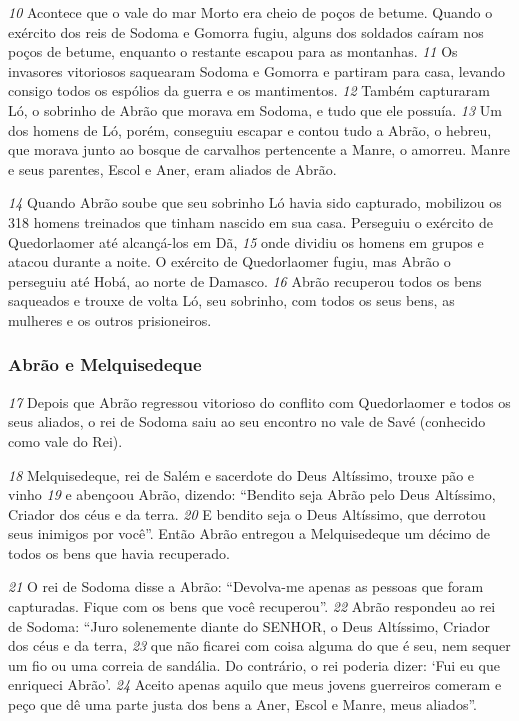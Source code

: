 \bigskip
\textit{\tiny 10}
Acontece que o vale do mar Morto era
cheio de poços de betume. Quando o exército dos reis de Sodoma e Gomorra
fugiu, alguns dos soldados caíram nos poços de betume, enquanto o restante
escapou para as montanhas. 
\textit{\tiny 11}
Os invasores vitoriosos saquearam Sodoma e
Gomorra e partiram para casa, levando consigo todos os espólios da guerra e os
mantimentos. 
\textit{\tiny 12}
Também capturaram Ló, o sobrinho de Abrão que morava em
Sodoma, e tudo que ele possuía.
\textit{\tiny 13}
Um dos homens de Ló, porém, conseguiu escapar e contou tudo a Abrão, o
hebreu, que morava junto ao bosque de carvalhos pertencente a Manre, o
amorreu. Manre e seus parentes, Escol e Aner, eram aliados de Abrão.

\bigskip
\textit{\tiny 14}
Quando Abrão soube que seu sobrinho Ló havia sido capturado, mobilizou os 318
 homens treinados que tinham nascido em sua casa. Perseguiu o exército de
Quedorlaomer até alcançá-los em Dã, 
\textit{\tiny 15}
onde dividiu os homens em grupos e
atacou durante a noite. O exército de Quedorlaomer fugiu, mas Abrão o perseguiu
até Hobá, ao norte de Damasco. 
\textit{\tiny 16}
Abrão recuperou todos os bens saqueados e
trouxe de volta Ló, seu sobrinho, com todos os seus bens, as mulheres e os outros
prisioneiros.

\bigskip
\subsubsection*{Abrão e Melquisedeque}
\textit{\tiny 17}
Depois que Abrão regressou vitorioso do conflito com Quedorlaomer e todos os
seus aliados, o rei de Sodoma saiu ao seu encontro no vale de Savé (conhecido
como vale do Rei).

\bigskip
\textit{\tiny 18}
Melquisedeque, rei de Salém e sacerdote do Deus Altíssimo, trouxe pão e
vinho 
\textit{\tiny 19}
e abençoou Abrão, dizendo:
  “Bendito seja Abrão pelo Deus Altíssimo,
    Criador dos céus e da terra.
\textit{\tiny 20}
E bendito seja o Deus Altíssimo, que derrotou seus inimigos por você”.
Então Abrão entregou a Melquisedeque um décimo de todos os bens que havia
recuperado.

\bigskip
\textit{\tiny 21}
O rei de Sodoma disse a Abrão: “Devolva-me apenas as pessoas que foram
capturadas. Fique com os bens que você recuperou”.
\textit{\tiny 22}
Abrão respondeu ao rei de Sodoma: “Juro solenemente diante do SENHOR, o
Deus Altíssimo, Criador dos céus e da terra, 
\textit{\tiny 23}
que não ficarei com coisa alguma
do que é seu, nem sequer um fio ou uma correia de sandália. Do contrário, o rei
poderia dizer: ‘Fui eu que enriqueci Abrão’. 
\textit{\tiny 24}
Aceito apenas aquilo que meus
jovens guerreiros comeram e peço que dê uma parte justa dos bens a Aner, Escol e
Manre, meus aliados”.

